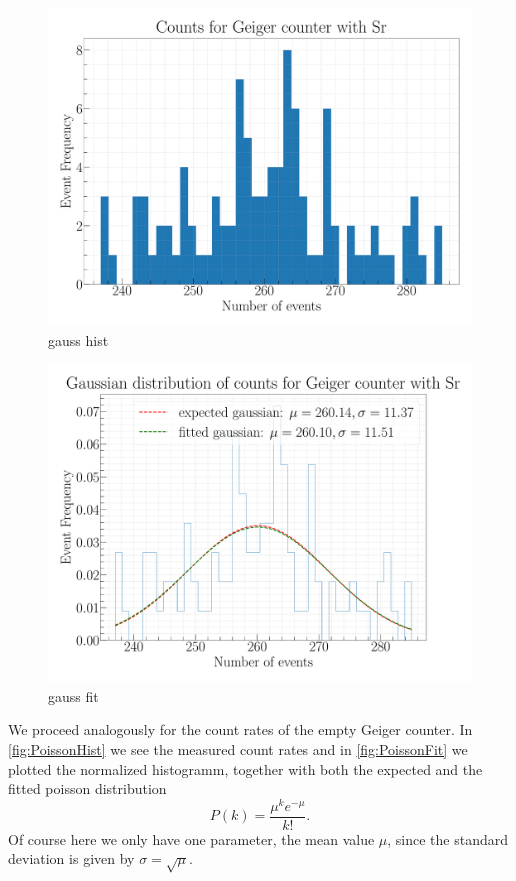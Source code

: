 \begin{figure}[H]
\centering
\includegraphics[width=\textwidth]{../Figures/Geiger_gauss_histogram.pdf}
\caption{gauss hist}
\label{fig:GaussHist}
\end{figure}

\begin{figure}[H]
\centering
\includegraphics[width=\textwidth]{../Figures/Geiger_gauss_fit.pdf}
\caption{gauss fit}
\label{fig:GaussFit}
\end{figure}

We proceed analogously for the count rates of the empty Geiger counter. In \cref{fig:PoissonHist} we see the measured count rates and in \cref{fig:PoissonFit} we plotted the normalized histogramm, together with both the expected and the fitted poisson distribution
\begin{equation}
P(k) = \frac{\mu^k e^{-\mu}}{k!}.
\end{equation}
Of course here we only have one parameter, the mean value $\mu$, since the standard deviation is given by $\sigma = \sqrt{\mu}$.

